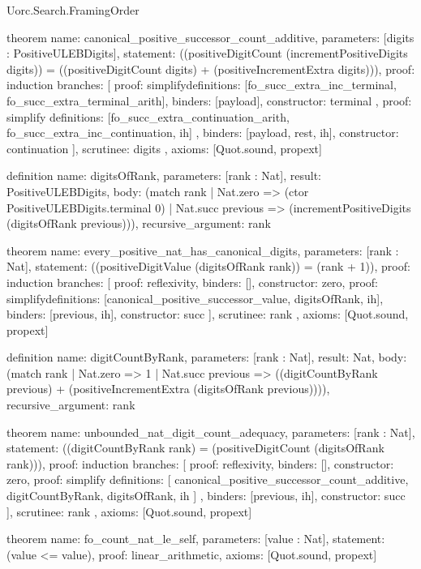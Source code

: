 \begin{lexlean}{Uorc.Search.FramingOrder}
\begin{semanticmodule}
theorem{
  name: canonical_positive_successor_count_additive,
  parameters: [digits : PositiveULEBDigits],
  statement: ((positiveDigitCount (incrementPositiveDigits digits)) = ((positiveDigitCount digits) + (positiveIncrementExtra digits))),
  proof: induction{
    branches: [
      {
        proof: simplify{definitions: [fo_succ_extra_inc_terminal, fo_succ_extra_terminal_arith]},
        binders: [payload],
        constructor: terminal
      },
      {
        proof: simplify{
          definitions: [fo_succ_extra_continuation_arith, fo_succ_extra_inc_continuation, ih]
        },
        binders: [payload, rest, ih],
        constructor: continuation
      }
    ],
    scrutinee: digits
  },
  axioms: [Quot.sound, propext]
}

definition{
  name: digitsOfRank,
  parameters: [rank : Nat],
  result: PositiveULEBDigits,
  body: (match rank
    | Nat.zero => (ctor PositiveULEBDigits.terminal 0)
    | Nat.succ previous => (incrementPositiveDigits (digitsOfRank previous))),
  recursive_argument: rank
}

theorem{
  name: every_positive_nat_has_canonical_digits,
  parameters: [rank : Nat],
  statement: ((positiveDigitValue (digitsOfRank rank)) = (rank + 1)),
  proof: induction{
    branches: [
      {proof: reflexivity{}, binders: [], constructor: zero},
      {
        proof: simplify{definitions: [canonical_positive_successor_value, digitsOfRank, ih]},
        binders: [previous, ih],
        constructor: succ
      }
    ],
    scrutinee: rank
  },
  axioms: [Quot.sound, propext]
}

definition{
  name: digitCountByRank,
  parameters: [rank : Nat],
  result: Nat,
  body: (match rank
    | Nat.zero => 1
    | Nat.succ previous => ((digitCountByRank previous) + (positiveIncrementExtra (digitsOfRank previous)))),
  recursive_argument: rank
}

theorem{
  name: unbounded_nat_digit_count_adequacy,
  parameters: [rank : Nat],
  statement: ((digitCountByRank rank) = (positiveDigitCount (digitsOfRank rank))),
  proof: induction{
    branches: [
      {proof: reflexivity{}, binders: [], constructor: zero},
      {
        proof: simplify{
          definitions: [
            canonical_positive_successor_count_additive,
            digitCountByRank,
            digitsOfRank,
            ih
          ]
        },
        binders: [previous, ih],
        constructor: succ
      }
    ],
    scrutinee: rank
  },
  axioms: [Quot.sound, propext]
}

theorem{
  name: fo_count_nat_le_self,
  parameters: [value : Nat],
  statement: (value <= value),
  proof: linear_arithmetic{},
  axioms: [Quot.sound, propext]
}


\end{semanticmodule}
\end{lexlean}
